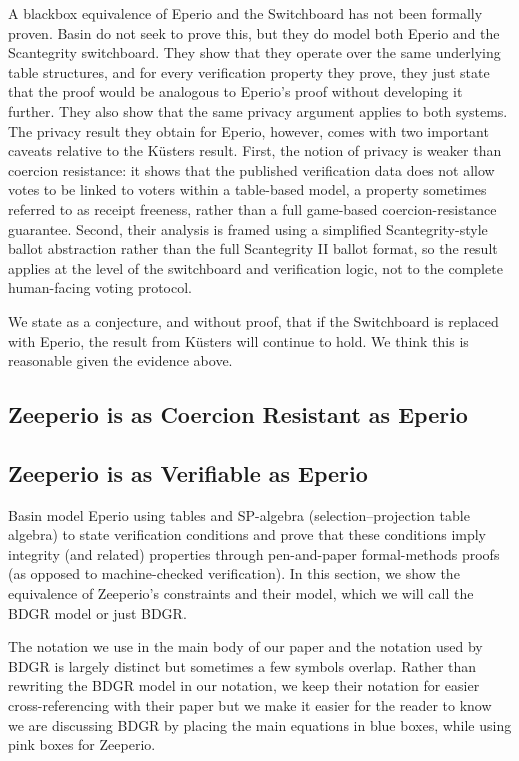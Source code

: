 A blackbox equivalence of Eperio and the Switchboard has not been formally proven. Basin \etal do not seek to prove this, but they do model both Eperio and the Scantegrity switchboard. They show that they operate over the same underlying table structures, and for every verification property they prove, they just state that the proof would be analogous to Eperio's proof without developing it further. They also show that the same privacy argument applies to both systems. The privacy result they obtain for Eperio, however, comes with two important caveats relative to the K{\"u}sters \etal result. First, the notion of privacy is weaker than coercion resistance: it shows that the published verification data does not allow votes to be linked to voters within a table-based model, a property sometimes referred to as receipt freeness, rather than a full game-based coercion-resistance guarantee. Second, their analysis is framed using a simplified Scantegrity-style ballot abstraction rather than the full Scantegrity II ballot format, so the result applies at the level of the switchboard and verification logic, not to the complete human-facing voting protocol.

We state as a conjecture, and without proof, that if the Switchboard is replaced with Eperio, the result from K{\"u}sters \etal will continue to hold. We think this is reasonable given the evidence above.

\subsection{Zeeperio is as Coercion Resistant as Eperio}
\label{sec:coercion}


\subsection{Zeeperio is as Verifiable as Eperio} 
\label{sec:verifiable}

Basin \etal model Eperio using tables and SP-algebra (selection–projection table algebra) to state verification conditions and prove that these conditions imply integrity (and related) properties through pen-and-paper formal-methods proofs (as opposed to machine-checked verification). In this section, we show the equivalence of Zeeperio's constraints and their model, which we will call the BDGR model or just BDGR. 

The notation we use in the main body of our paper and the notation used by BDGR is largely distinct but sometimes a few symbols overlap. Rather than rewriting the BDGR model in our notation, we keep their notation for easier cross-referencing with their paper but we make it easier for the reader to know we are discussing BDGR by placing the main equations in blue boxes, while using pink boxes for Zeeperio.

